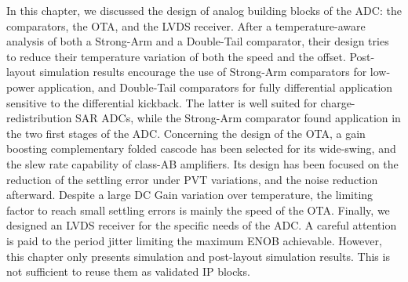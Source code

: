 In this chapter, we discussed the design of analog building blocks of the ADC\@: the comparators, the OTA, and the LVDS receiver. After a temperature-aware analysis of both a Strong-Arm and a Double-Tail comparator, their design tries to reduce their temperature variation of both the speed and the offset. Post-layout simulation results encourage the use of Strong-Arm comparators for low-power application, and Double-Tail comparators for fully differential application sensitive to the differential kickback. The latter is well suited for charge-redistribution SAR ADCs, while the Strong-Arm comparator found application in the two first stages of the ADC\@.
Concerning the design of the OTA, a gain boosting complementary folded cascode has been selected for its wide-swing, and the slew rate capability of class-AB amplifiers. Its design has been focused on the reduction of the settling error under PVT variations, and the noise reduction afterward. Despite a large DC Gain variation over temperature, the limiting factor to reach small settling errors is mainly the speed of the OTA\@.
Finally, we designed an LVDS receiver for the specific needs of the ADC\@. A careful attention is paid to the period jitter limiting the maximum ENOB achievable.
However, this chapter only presents simulation and post-layout simulation results. This is not sufficient to reuse them as validated IP blocks.
